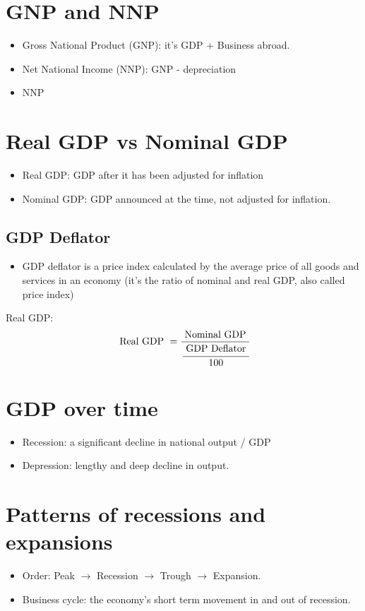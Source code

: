 \documentclass[openany]{book}
\begin{document}
\section{GNP and NNP}
\begin{itemize}
    \item Gross National Product (GNP): it's GDP + Business abroad. 
    \item Net National Income (NNP): GNP - depreciation
    \item NNP 
\end{itemize}
%
\section{Real GDP vs Nominal GDP}
\begin{itemize}
    \item Real GDP: GDP after it has been adjusted for inflation 
    \item Nominal GDP: GDP announced at the time, not adjusted for inflation. 
\end{itemize}
%
\subsection{GDP Deflator}
\begin{itemize}
    \item GDP deflator is a price index calculated by the average price of all goods and services in an economy (it's the ratio of nominal and real GDP, also called price index)
\end{itemize}
Real GDP: 
\[
    \text{ Real GDP } = \frac{\text{ Nominal GDP }}{\cfrac{\text{ GDP Deflator }}{100}} 
\]

\section{GDP over time}
\begin{itemize}
    \item Recession: a significant decline in national output / GDP
    \item Depression: lengthy and deep decline in output. 
\end{itemize}

\section{Patterns of recessions and expansions}
\begin{itemize}
    \item Order: Peak $\rightarrow$ Recession $\rightarrow$ Trough $\rightarrow$ Expansion. 
    \item Business cycle: the economy's short term movement in and out of recession. 
\end{itemize}
\end{document}
